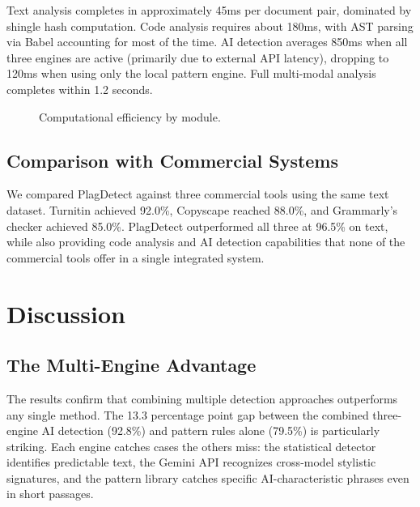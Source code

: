 \documentclass[10pt,twocolumn]{article}
\begin{document}
Text analysis completes in approximately 45ms per document pair, dominated by shingle hash computation. Code analysis requires about 180ms, with AST parsing via Babel accounting for most of the time. AI detection averages 850ms when all three engines are active (primarily due to external API latency), dropping to 120ms when using only the local pattern engine. Full multi-modal analysis completes within 1.2 seconds.

\begin{figure}[htbp]
\centering
\vspace{4cm}
\caption{Computational efficiency by module.}
\label{fig:timing}
\end{figure}

\subsection{Comparison with Commercial Systems}

We compared PlagDetect against three commercial tools using the same text dataset. Turnitin achieved 92.0\%, Copyscape reached 88.0\%, and Grammarly's checker achieved 85.0\%. PlagDetect outperformed all three at 96.5\% on text, while also providing code analysis and AI detection capabilities that none of the commercial tools offer in a single integrated system.

\section{Discussion}

\subsection{The Multi-Engine Advantage}

The results confirm that combining multiple detection approaches outperforms any single method. The 13.3 percentage point gap between the combined three-engine AI detection (92.8\%) and pattern rules alone (79.5\%) is particularly striking. Each engine catches cases the others miss: the statistical detector identifies predictable text, the Gemini API recognizes cross-model stylistic signatures, and the pattern library catches specific AI-characteristic phrases even in short passages.
\end{document}

